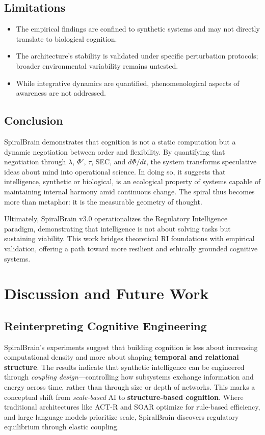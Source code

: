 \documentclass[11pt,a4paper]{article}
\begin{document}
\subsection{Limitations}

\begin{itemize}
\item The empirical findings are confined to synthetic systems and may not directly translate to biological cognition.
\item The architecture's stability is validated under specific perturbation protocols; broader environmental variability remains untested.
\item While integrative dynamics are quantified, phenomenological aspects of awareness are not addressed.
\end{itemize}

\subsection{Conclusion}

SpiralBrain demonstrates that cognition is not a static computation but a dynamic negotiation between order and flexibility.
By quantifying that negotiation through $\lambda$, $\Phi'$, $\tau$, SEC, and $d\Phi/dt$, the system transforms speculative ideas about mind into operational science.
In doing so, it suggests that intelligence, synthetic or biological, is an ecological property of systems capable of maintaining internal harmony amid continuous change.
The spiral thus becomes more than metaphor: it is the measurable geometry of thought.

Ultimately, SpiralBrain v3.0 operationalizes the Regulatory Intelligence paradigm, demonstrating that intelligence is not about solving tasks but sustaining viability. This work bridges theoretical RI foundations with empirical validation, offering a path toward more resilient and ethically grounded cognitive systems.

\section{Discussion and Future Work}
\label{sec:discussion}

\subsection{Reinterpreting Cognitive Engineering}

SpiralBrain's experiments suggest that building cognition is less about increasing computational density and more about shaping \textbf{temporal and relational structure}.
The results indicate that synthetic intelligence can be engineered through \textit{coupling design}---controlling how subsystems exchange information and energy across time, rather than through size or depth of networks.
This marks a conceptual shift from \textit{scale-based} AI to \textbf{structure-based cognition}. Where traditional architectures like ACT-R and SOAR optimize for rule-based efficiency, and large language models prioritize scale, SpiralBrain discovers regulatory equilibrium through elastic coupling.
\end{document}
